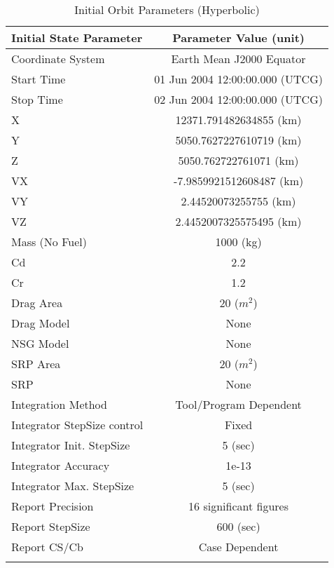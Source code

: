 \begin{table}[htbp!]
\centering \caption{Initial Orbit Parameters (Hyperbolic)}
      \begin{tabular}{lc}
      \hline\hline
            Initial State Parameter & Parameter Value (unit)\\
            \hline
            Coordinate System & Earth Mean J2000 Equator\\
            Start Time & 01 Jun 2004 12:00:00.000 (UTCG)\\
            Stop Time & 02 Jun 2004 12:00:00.000 (UTCG)\\
            X & 12371.791482634855 (km)\\
            Y & 5050.7627227610719 (km)\\
            Z & 5050.762722761071 (km)\\
            VX & -7.9859921512608487 (km)\\
            VY & 2.44520073255755 (km)\\
            VZ & 2.4452007325575495 (km)\\
            Mass (No Fuel) & 1000 (kg)\\
            Cd & 2.2\\
            Cr & 1.2\\
            Drag Area & 20 ($m^2$)\\
            Drag Model & None\\
            NSG Model & None\\
            SRP Area & 20 ($m^2$)\\
            SRP & None\\
            Integration Method & Tool/Program Dependent\\
            Integrator StepSize control & Fixed\\
            Integrator Init. StepSize & 5 (sec)\\
            Integrator Accuracy & 1e-13\\
            Integrator Max. StepSize & 5 (sec)\\
            Report Precision & 16 significant figures\\
            Report StepSize & 600 (sec)\\
            Report CS/Cb & Case Dependent\\
      \hline\hline
      \label{Table: InitStateHyper}
\end{tabular}
\end{table}

\clearpage
